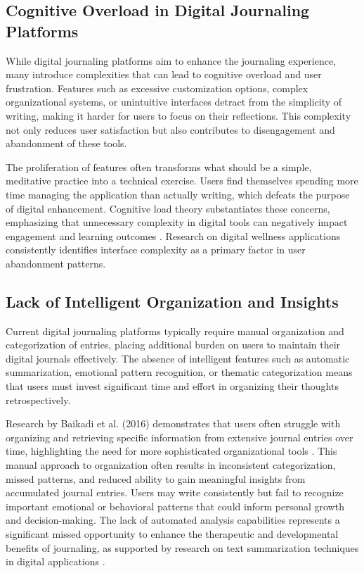 \subsection{Cognitive Overload in Digital Journaling Platforms}\label{subsec:cognitive-overload}

While digital journaling platforms aim to enhance the journaling experience, many introduce complexities that can lead to cognitive overload and user frustration. Features such as excessive customization options, complex organizational systems, or unintuitive interfaces detract from the simplicity of writing, making it harder for users to focus on their reflections. This complexity not only reduces user satisfaction but also contributes to disengagement and abandonment of these tools.

The proliferation of features often transforms what should be a simple, meditative practice into a technical exercise. Users find themselves spending more time managing the application than actually writing, which defeats the purpose of digital enhancement. Cognitive load theory substantiates these concerns, emphasizing that unnecessary complexity in digital tools can negatively impact engagement and learning outcomes \cite{sloan2015efficacy}. Research on digital wellness applications consistently identifies interface complexity as a primary factor in user abandonment patterns.

\subsection{Lack of Intelligent Organization and Insights}\label{subsec:lack-intelligence}

Current digital journaling platforms typically require manual organization and categorization of entries, placing additional burden on users to maintain their digital journals effectively. The absence of intelligent features such as automatic summarization, emotional pattern recognition, or thematic categorization means that users must invest significant time and effort in organizing their thoughts retrospectively.

Research by Baikadi et al. (2016) demonstrates that users often struggle with organizing and retrieving specific information from extensive journal entries over time, highlighting the need for more sophisticated organizational tools \cite{baikadi2016exploring}. This manual approach to organization often results in inconsistent categorization, missed patterns, and reduced ability to gain meaningful insights from accumulated journal entries. Users may write consistently but fail to recognize important emotional or behavioral patterns that could inform personal growth and decision-making. The lack of automated analysis capabilities represents a significant missed opportunity to enhance the therapeutic and developmental benefits of journaling, as supported by research on text summarization techniques in digital applications \cite{allahyari2017text}.

